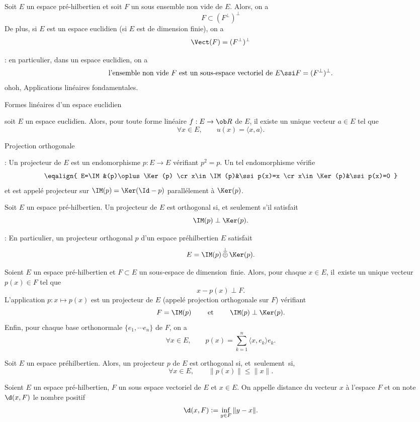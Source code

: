 \Propriete []  Soit $E$ un espace pré-hilbertien et soit $F$ un sous ensemble non vide de $E$. 
Alors, on a 
$$
F\subset (F^\perp)^\perp
$$
De plus, si $E$ est un espace euclidien (si $E$ est de dimension finie), on a 
$$
\Vect(F)=(F^\perp)^\perp
$$

\Remarque : en particulier, dans un espace euclidien, on a 
$$
\mbox{l'ensemble non vide }F\mbox{ est un sous-espace vectoriel de $E$}\ssi F=(F^\perp)^\perp.
$$
\Subsection ohoh, Applications linéaires fondamentales.

\Concept [] Formes linéaires d'un espace euclidien

\Propriete []  soit $E$ un espace euclidien. Alors, pour toute forme linéaire $f:E\to\ob R$ de $E$, il existe un unique vecteur $a\in E$ tel que 
$$
\forall x\in E, \qquad u(x)=\langle x,a\rangle.
$$

\Concept [] Projection orthogonale

\Rappel :  Un projecteur de $E$ est un endomorphisme $p:E\to E$ vérifiant $p^2=p$. Un tel endomorphisme vérifie
$$
\eqalign{
E=\IM&(p)\oplus\Ker(p)
\cr
x\in\IM(p)&\ssi p(x)=x
\cr
x\in \Ker(p)&\ssi p(x)=0
}
$$
et est appelé projecteur sur $\IM(p)=\Ker(\Id-p)$ parallélement à $\Ker(p)$. \pn
\bigskip

\Definition []  Soit $E$ un espace pré-hilbertien. Un projecteur de $E$ est orthogonal si, et seulement s'il satisfait 
$$
\IM(p)\perp\Ker(p).
$$

\Remarque : En particulier, un projecteur orthogonal $p$ d'un espace préhilbertien $E$ satisfait 
$$
E=\IM(p)\mathop{\oplus}\limits^\perp\Ker(p).
$$

\Propriete []  Soient $E$ un espace pré-hilbertien et $F\subset E$ un sous-espace de dimension~finie.
Alors, pour chaque $x\in E$, il~existe un unique vecteur $p(x)\in F$ 
tel que 
$$
x-p(x)\perp F.
$$ 
L'application $p:x\mapsto p(x)$ est un projecteur de $E$ (appelé projection orthogonale sur $F$) vérifiant 
$$
F=\IM(p)\qquad\mbox{ et }\qquad \IM(p)\perp\Ker(p).
$$ 
\pn 
Enfin, pour chaque base orthonormale $\{e_1,\cdots e_n\}$ de $F$, on a 
$$
\forall x\in E, \qquad p(x)=\sum_{k=1}^n\langle x,e_k\rangle e_k.
$$

\Propriete []  Soit $E$ un espace préhilbertien. Alors, un projecteur $p$ de $E$ est orthogonal si, et~seulement~si,
$$
\forall x\in E, \qquad \|p(x)\|\le \|x\|. 
$$

\Definition []  Soient $E$ un espace pré-hilbertien, $F$ un sous espace vectoriel de $E$ et $x\in E$. 
On appelle distance du vecteur $x$ à l'espace $F$ et on note $\d(x,F)$ le nombre positif 
$$
\d(x,F):=\inf_{y\in F}\|y-x\|.
$$

